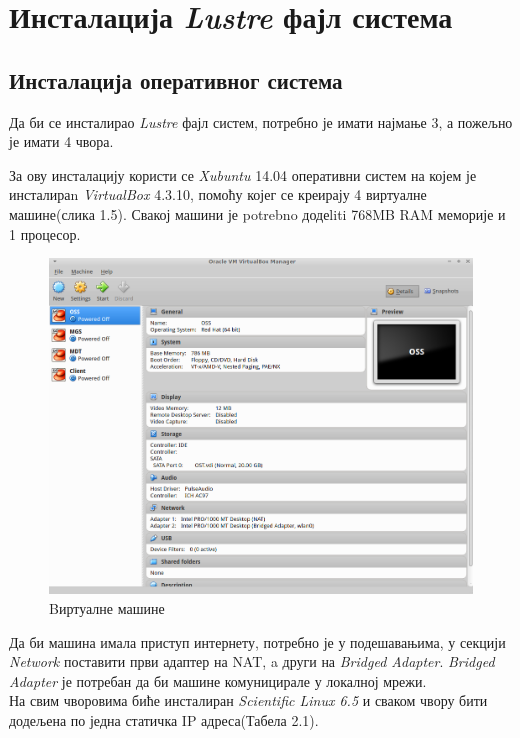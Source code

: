 \section{Инсталација   \textit{Lustre} фајл система}
\subsection{Инсталација оперативног система}

Да би се инсталирао \textit{Lustre} фајл систем, потребно је имати најмање 3, а пожељно је имати 4 чвора. 

За ову инсталацију користи се \textit{Xubuntu} 14.04 оперативни систем на којем је инсталираn \textit{VirtualBox} 4.3.10, помоћу којег се креирају 4 виртуалне машине(слика 1.5). Свакој машини је potrebno додеliti 768MB RAM меморије и 1 процесор.
\begin{figure}[h!]
  \centering
      \includegraphics[width=1\textwidth]{slike/virtualbox.png}
  \caption{Bиртуалне машине}
\end{figure}
Да би машина имала приступ интернету, потребно је у подешавањима, у секцији \textit{Network} поставити први адаптер на \gls{NAT}, a други на \textit{Bridged Adapter}. 	\textit{Bridged Adapter} је потребан да би машине комуницирале у локалној мрежи.
~\\[3cm]
На свим чворовима биће инсталиран \textit{Scientific Linux 6.5} и сваком чвору бити додељена по једна статичка IP адреса(Табела 2.1).
